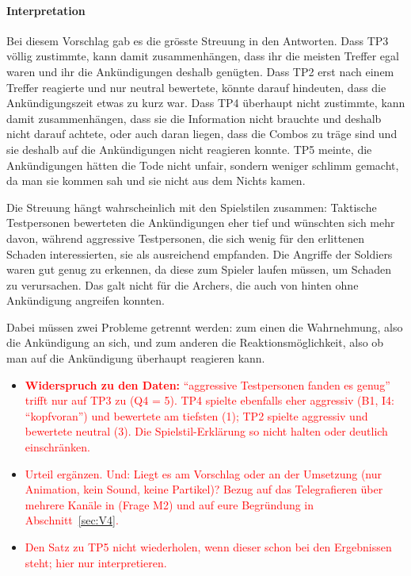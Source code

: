 \documentclass[../Main.tex]{subfiles}
\begin{document}
\paragraph{Interpretation}
Bei diesem Vorschlag gab es die grösste Streuung in den Antworten. Dass TP3 völlig zustimmte, kann damit zusammenhängen, dass ihr die meisten Treffer egal waren und ihr die Ankündigungen deshalb genügten. Dass TP2 erst nach einem Treffer reagierte und nur neutral bewertete, könnte darauf hindeuten, dass die Ankündigungszeit etwas zu kurz war. Dass TP4 überhaupt nicht zustimmte, kann damit zusammenhängen, dass sie die Information nicht brauchte und deshalb nicht darauf achtete, oder auch daran liegen, dass die Combos zu träge sind und sie deshalb auf die Ankündigungen nicht reagieren konnte. TP5 meinte, die Ankündigungen hätten die Tode nicht unfair, sondern weniger schlimm gemacht, da man sie kommen sah und sie nicht aus dem Nichts kamen.

Die Streuung hängt wahrscheinlich mit den Spielstilen zusammen: Taktische Testpersonen bewerteten die Ankündigungen eher tief und wünschten sich mehr davon, während aggressive Testpersonen, die sich wenig für den erlittenen Schaden interessierten, sie als ausreichend empfanden. Die Angriffe der Soldiers waren gut genug zu erkennen, da diese zum Spieler laufen müssen, um Schaden zu verursachen. Das galt nicht für die Archers, die auch von hinten ohne Ankündigung angreifen konnten.

Dabei müssen zwei Probleme getrennt werden: zum einen die Wahrnehmung, also die Ankündigung an sich, und zum anderen die Reaktionsmöglichkeit, also ob man auf die Ankündigung überhaupt reagieren kann.

\begin{itemize}[leftmargin=1.5cm]
    \item \textcolor{red}{\textbf{Widerspruch zu den Daten:} \enquote{aggressive Testpersonen fanden es genug} trifft nur auf TP3 zu (Q4 = 5). TP4 spielte ebenfalls eher aggressiv (B1, I4: \enquote{kopfvoran}) und bewertete am tiefsten (1); TP2 spielte aggressiv und bewertete neutral (3). Die Spielstil-Erklärung so nicht halten oder deutlich einschränken.}
    \item \textcolor{red}{Urteil ergänzen. Und: Liegt es am Vorschlag oder an der Umsetzung (nur Animation, kein Sound, keine Partikel)? Bezug auf das Telegrafieren über mehrere Kanäle in  (Frage M2) und auf eure Begründung in Abschnitt~\ref{sec:V4}.}
    \item \textcolor{red}{Den Satz zu TP5 nicht wiederholen, wenn dieser schon bei den Ergebnissen steht; hier nur interpretieren.}
\end{itemize}
\end{document}
